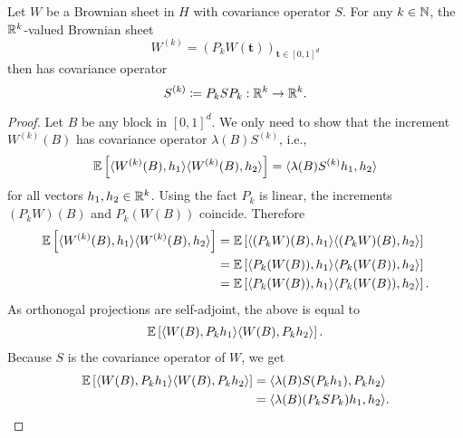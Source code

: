 \begin{lemma} \label{lemma covariance operator of projected brownian sheet}
    Let $W$ be a Brownian sheet in $H$ with covariance operator $S$. For any $k \in \mathbb{N}$, the $\mathbb{R}^k$-valued Brownian sheet
    \[ W^{(k)} = (P_k W(\mathbf{t}))_{\mathbf{t} \in [0,1]^d} \]
    then has covariance operator
    \[ S^{(k)} \coloneqq P_k S P_k: \mathbb{R}^k \to \mathbb{R}^k. \]
\end{lemma}
\begin{proof}
    Let $B$ be any block in $[0, 1]^d$. We only need to show that the increment $W^{(k)}(B)$ has covariance operator $\lambda(B) S^{(k)}$, i.e.,
    \[ \mathbb{E}\left[\langle W^{(k)}(B), h_1 \rangle \langle W^{(k)}(B), h_2 \rangle\right] = \langle \lambda(B) S^{(k)} h_1, h_2 \rangle \]
    for all vectors $h_1, h_2 \in \mathbb{R}^k$. Using the fact $P_k$ is linear, the increments $(P_k W)(B)$ and $P_k (W(B))$ coincide. Therefore
    \begin{align*}
        \mathbb{E}\left[\langle W^{(k)}(B), h_1 \rangle \langle W^{(k)}(B), h_2 \rangle\right]
        & = \mathbb{E}\left[\langle (P_k W)(B), h_1 \rangle \langle (P_k W)(B), h_2 \rangle\right] \\
        & = \mathbb{E}\left[\langle P_k (W(B)), h_1 \rangle \langle P_k (W(B)), h_2 \rangle\right] \\
        & = \mathbb{E}\left[\langle P_k (W(B)), h_1 \rangle \langle P_k (W(B)), h_2 \rangle\right].
    \end{align*}
    As orthonogal projections are self-adjoint, the above is equal to
    \begin{align*}
        \mathbb{E}\left[\langle W(B), P_k h_1 \rangle \langle W(B), P_k h_2 \rangle\right].
    \end{align*}
    Because $S$ is the covariance operator of $W$, we get
    \begin{align*}
        \mathbb{E}\left[\langle W(B), P_k h_1 \rangle \langle W(B), P_k h_2 \rangle\right] 
        & = \langle \lambda(B) S (P_k h_1), P_k h_2 \rangle \\
        & = \langle \lambda(B) (P_k S P_k) h_1, h_2 \rangle.
    \end{align*}
\end{proof}

